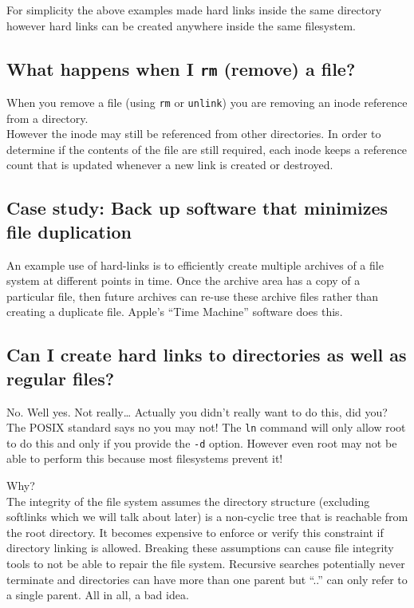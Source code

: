 For simplicity the above examples made hard links inside the same
directory however hard links can be created anywhere inside the same
filesystem.

\subsection{\texorpdfstring{What happens when I \texttt{rm} (remove) a
file?}{What happens when I rm (remove) a file?}}\label{what-happens-when-i-rm-remove-a-file}

When you remove a file (using \texttt{rm} or \texttt{unlink}) you are
removing an inode reference from a directory.\\However the inode may
still be referenced from other directories. In order to determine if the
contents of the file are still required, each inode keeps a reference
count that is updated whenever a new link is created or destroyed.

\subsection{Case study: Back up software that minimizes file
duplication}\label{case-study-back-up-software-that-minimizes-file-duplication}

An example use of hard-links is to efficiently create multiple archives
of a file system at different points in time. Once the archive area has
a copy of a particular file, then future archives can re-use these
archive files rather than creating a duplicate file. Apple's ``Time
Machine'' software does this.

\subsection{Can I create hard links to directories as well as regular
files?}\label{can-i-create-hard-links-to-directories-as-well-as-regular-files}

No. Well yes. Not really\ldots{} Actually you didn't really want to do
this, did you?\\The POSIX standard says no you may not! The \texttt{ln}
command will only allow root to do this and only if you provide the
\texttt{-d} option. However even root may not be able to perform this
because most filesystems prevent it!

Why?\\The integrity of the file system assumes the directory structure
(excluding softlinks which we will talk about later) is a non-cyclic
tree that is reachable from the root directory. It becomes expensive to
enforce or verify this constraint if directory linking is allowed.
Breaking these assumptions can cause file integrity tools to not be able
to repair the file system. Recursive searches potentially never
terminate and directories can have more than one parent but ``..'' can
only refer to a single parent. All in all, a bad idea.

